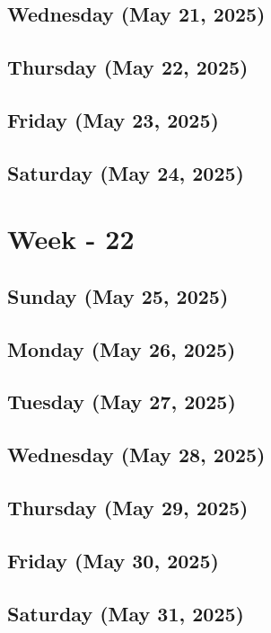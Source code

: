\subsection*{Wednesday (May 21, 2025)}
\subsection*{Thursday (May 22, 2025)}
\subsection*{Friday (May 23, 2025)}
\subsection*{Saturday (May 24, 2025)}

\section{Week - 22}
\subsection*{Sunday (May 25, 2025)}
\subsection*{Monday (May 26, 2025)}
\subsection*{Tuesday (May 27, 2025)}
\subsection*{Wednesday (May 28, 2025)}
\subsection*{Thursday (May 29, 2025)}
\subsection*{Friday (May 30, 2025)}
\subsection*{Saturday (May 31, 2025)}


\newpage
\begin{spacing}{1.0}
\renewcommand{\bibname}{\bf{References}}


\end{spacing}